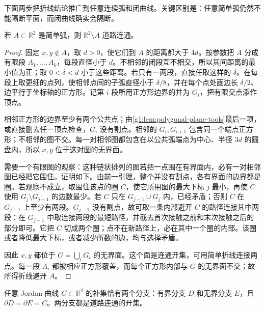 下面两步把折线结论推广到任意连续弧和闭曲线。关键区别是：任意简单弧仍然不能隔断平面，而闭曲线确实会隔断。

\begin{lemma}\label{g1:lem:arc-nonseparation}
	若 \(A\subset\mathbb R^2\) 是简单弧，则 \(\mathbb R^2\setminus A\) 道路连通。
\end{lemma}

\begin{proof}
	固定 \(x,y\notin A\)，取 \(d>0\)，使它们到 \(A\) 的距离都大于 \(4d\)。按参数把 \(A\) 分成有限段 \(A_1,\ldots,A_k\)，每段直径小于 \(d\)。不相邻的闭段互不相交，所以其间距离的最小值为正；取 \(0<\delta<d\) 小于这些距离。若只有一两段，直接任取这样的 \(\delta\)。在每段上取更细的点列，使相邻点间的子弧直径小于 \(\delta/8\)，并在每个点处画边长 \(\delta/2\)、边平行于坐标轴的正方形。记第 \(i\) 段所用正方形边界的并为 \(G_i\)，把有限交点添作顶点。

	相邻正方形的边界至少有两个公共点；由\cref{g1:lem:polygonal-plane-tools}最后一项，或直接删去任一顶点检查，\(G_i\) 没有割点。相邻的 \(G_i,G_{i+1}\) 包含同一个端点正方形；不相邻的图不交。每一对相邻图都包含在以公共弧端点为中心、半径 \(3d\) 的圆盘内，所以 \(x,y\) 位于这对图的无界面。

	需要一个有限图的观察：这种链状排列的图若把一点围在有界面内，必有一对相邻图已经把它围住。证明如下。由前一引理，整个并没有割点，各有界面的边界都是圈。若观察不成立，取围住该点的圈 \(C\)，使它所用图的最大下标 \(j\) 最小，再使 \(C\) 使用 \(G_j\setminus G_{j-1}\) 的边数最少。若 \(C\) 只在 \(G_{j-1}\cup G_j\) 内，已经矛盾；否则 \(C\) 在 \(G_{j-1}\) 上至少有两段。\(G_{j-1}\) 没有割点，故可取一条内部避开 \(C\) 的路径连接其中两段：在 \(G_{j-1}\) 中取连接两段的最短路径，并截去首次接触之前和末次接触之后的部分即可。它把 \(C\) 切成两个圈；点不在新路径上，必在其中一个圈的内部。该圈或者降低最大下标，或者减少所数的边，均与选择矛盾。

	因此 \(x,y\) 都位于 \(G=\bigcup_iG_i\) 的无界面。这个面是连通开集，可用简单折线连接两点。每一段 \(A_i\) 都被相应正方形覆盖，而每个正方形内部与 \(G\) 的无界面不交；故所得折线避开 \(A\)。
\end{proof}

\begin{theorem}\label{g1:thm:jordan-separation}
	任意 Jordan 曲线 \(C\subset\mathbb R^2\) 的补集恰有两个分支：有界分支 \(D\) 和无界分支 \(E\)，且 \(\partial D=\partial E=C\)。两分支都是道路连通的开集。
\end{theorem}

